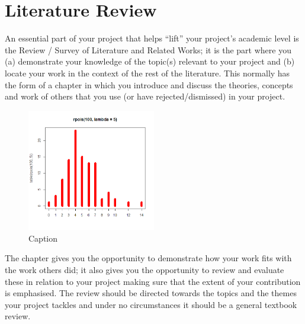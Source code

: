 \chapter{Literature Review}
An essential part of your project that helps “lift” your project’s academic level is the Review /
Survey of Literature and Related Works; it is the part where you (a) demonstrate your
knowledge of the topic(s) relevant to your project and (b) locate your work in the context of the
rest of the literature. This normally has the form of a chapter in which you introduce and discuss
the theories, concepts and work of others that you use (or have rejected/dismissed) in your
project. 
\begin{figure}[h]
\centering
\includegraphics[width=0.5\textwidth]{./images/plotTest01}
\caption{Caption}
\label{fig:plot01}
\end{figure}
The chapter gives you the opportunity to demonstrate how your work fits with the work
others did; it also gives you the opportunity to review and evaluate these in relation to your
project making sure that the extent of your contribution is emphasised. The review should be
directed towards the topics and the themes your project tackles and under no circumstances it
should be a general textbook review.